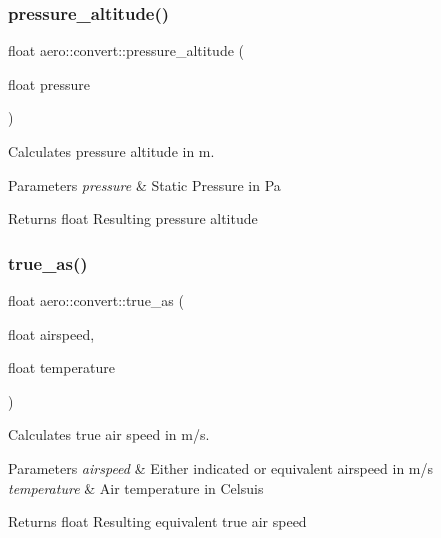 \subsubsection{\texorpdfstring{pressure\+\_\+altitude()}{pressure\_altitude()}}
{\footnotesize\ttfamily float aero\+::convert\+::pressure\+\_\+altitude (\begin{DoxyParamCaption}\item[{float}]{pressure }\end{DoxyParamCaption})}



Calculates pressure altitude in m. 


\begin{DoxyParams}{Parameters}
{\em pressure} & Static Pressure in Pa \\
\hline
\end{DoxyParams}
\begin{DoxyReturn}{Returns}
float Resulting pressure altitude 
\end{DoxyReturn}
\mbox{\label{namespaceaero_1_1convert_a76676002927e969f289ea46720db730b}} 
\subsubsection{\texorpdfstring{true\+\_\+as()}{true\_as()}}
{\footnotesize\ttfamily float aero\+::convert\+::true\+\_\+as (\begin{DoxyParamCaption}\item[{float}]{airspeed,  }\item[{float}]{temperature }\end{DoxyParamCaption})}



Calculates true air speed in m/s. 


\begin{DoxyParams}{Parameters}
{\em airspeed} & Either indicated or equivalent airspeed in m/s \\
\hline
{\em temperature} & Air temperature in Celsuis \\
\hline
\end{DoxyParams}
\begin{DoxyReturn}{Returns}
float Resulting equivalent true air speed 
\end{DoxyReturn}
